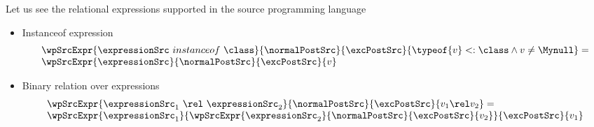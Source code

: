 Let us see the relational expressions supported in the source programming language

\begin{itemize} 
     \item Instanceof expression
	        $$ \begin{array}{l} \wpSrcExpr{ \expressionSrc \ instanceof \ \class }{\normalPostSrc }{ \excPostSrc }{ \typeof{ v } <:  \class \wedge v \neq \Mynull} = \\
	                \wpSrcExpr{ \expressionSrc  }{ \normalPostSrc }{ \excPostSrc }{v}
	            \end{array} $$

     \item Binary relation over expressions
            $$ \begin{array}{l} \wpSrcExpr{ \expressionSrc_1 \ \rel \ \expressionSrc_2 }{\normalPostSrc }{ \excPostSrc }{v_1 \rel v_2} = \\
	                \wpSrcExpr{ \expressionSrc_1  }{  \wpSrcExpr{ \expressionSrc_2  }{ \normalPostSrc }{ \excPostSrc }{v_2}  }{ \excPostSrc }{v_1}
	            \end{array} $$
\end{itemize}
